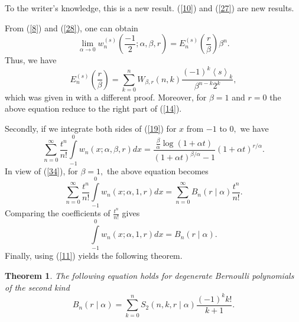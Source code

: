 \documentclass{article}%
\newtheorem{theorem}{Theorem}
\begin{document}
To the writer's knowledge, this is a new result. (\ref{10}) and (\ref{27}) are
new results.

From (\ref{8}) and (\ref{28}), one can obtain%
\[
\underset{\alpha\rightarrow0}{\lim}w_{n}^{\left(  s\right)  }\left(  \frac
{-1}{2};\alpha,\beta,r\right)  =E_{n}^{\left(  s\right)  }\left(  \frac
{r}{\beta}\right)  \beta^{n}.
\]
Thus, we have
\[
E_{n}^{\left(  s\right)  }\left(  \frac{r}{\beta}\right)  =\sum_{k=0}%
^{n}W_{\beta,r}\left(  n,k\right)  \frac{\left(  -1\right)  ^{k}\left\langle
s\right\rangle _{k}}{\beta^{n-k}2^{k}},
\]
which was given in \cite{Mihioubi2} with a different proof. Moreover, for
$\beta=1$ and $r=0$ the above equation reduce to the right part of (\ref{14}).

Secondly, if we integrate both sides of (\ref{19}) for $x$ from $-1$ to $0,$
we have%
\begin{equation}
\sum_{n=0}^{\infty}\frac{t^{n}}{n!}%
{\displaystyle\int\limits_{-1}^{0}}
w_{n}\left(  x;\alpha,\beta,r\right)  dx=\frac{\frac{\beta}{\alpha}\log\left(
1+\alpha t\right)  }{\left(  1+\alpha t\right)  ^{\beta/\alpha}-1}\left(
1+\alpha t\right)  ^{r/\alpha}. \label{20}%
\end{equation}
In view of (\ref{34}), for $\beta=1,$ the above equation becomes%
\[
\sum_{n=0}^{\infty}\frac{t^{n}}{n!}%
{\displaystyle\int\limits_{-1}^{0}}
w_{n}\left(  x;\alpha,1,r\right)  dx=\sum_{n=0}^{\infty}B_{n}\left(
r\mid\alpha\right)  \frac{t^{n}}{n!}.
\]
Comparing the coefficients of $\frac{t^{n}}{n!}$ gives
\[%
{\displaystyle\int\limits_{-1}^{0}}
w_{n}\left(  x;\alpha,1,r\right)  dx=B_{n}\left(  r\mid\alpha\right)  .
\]
Finally, using (\ref{11}) yields the following theorem.

\begin{theorem}
The following equation holds for degenerate Bernoulli polynomials of the
second kind%
\[
B_{n}\left(  r\mid\alpha\right)  =\sum_{k=0}^{n}S_{2}\left(  n,k,r\mid
\alpha\right)  \frac{\left(  -1\right)  ^{k}k!}{k+1}.
\]

\end{theorem}
\end{document}
